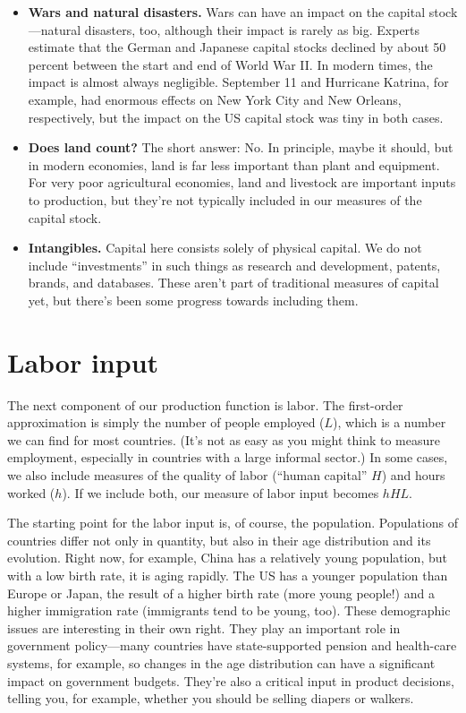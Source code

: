 \begin{itemize}
\item \textbf{Wars and natural disasters.}
Wars can have an impact on the capital stock---natural disasters, too,
although their impact is rarely as big.
Experts estimate that the German and Japanese capital stocks declined
by about 50 percent  between the start and end of World War II.
In modern times, the impact is almost always negligible.
September 11 and Hurricane Katrina, for example, had
enormous effects on New York City and New Orleans, respectively,
but the impact on the US capital stock was tiny in both cases.

\item \textbf{Does land count?}  The short answer:  No.
In principle, maybe it should, but in modern economies, land is far less important
than plant and equipment.
For very poor agricultural economies, land and livestock are important
inputs to production, but they're not typically included in our
measures of the capital stock.

\item \textbf{Intangibles.}
Capital here consists solely of physical capital.
We do not include ``investments'' in such things
as research and development, patents, brands, and databases.
These aren't part of traditional measures of capital yet,
but there's been some progress towards including them.

\end{itemize}



\section{Labor input}

The next component of our production function is labor.
The first-order approximation is simply the number of people employed ($L$),
which is a number we can find for most countries.
(It's not as easy as you might think to measure employment,
especially in countries with a large informal sector.)
In some cases, we also include measures of the quality of labor
(``human capital'' $H$) and hours worked ($h$).
If we include both, our measure of labor input becomes
$hHL$.


The starting point for the labor input is, of course, the population.
Populations of countries differ not only in quantity,
but also in their age distribution and its evolution.
Right now, for example, China has a relatively young population,
but with a low birth rate, it is aging rapidly.
The US has a younger population than Europe or Japan,
the result of a higher birth rate (more young people!)
and a higher immigration rate (immigrants tend to be young, too).
These demographic issues are interesting in their own right.
They play an important role in government policy---many countries have state-supported pension and health-care systems,
for example, so changes in the age distribution can have
a significant impact on government budgets.
They're also a critical input in product decisions,
telling you, for example, whether you should be selling
diapers or walkers.


